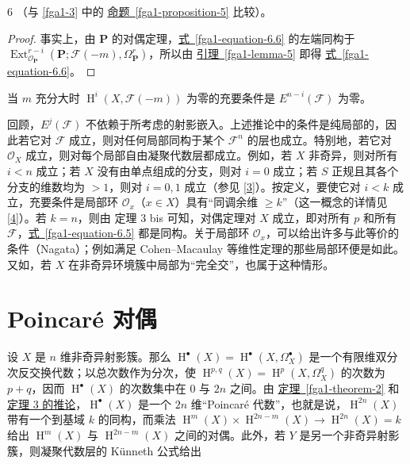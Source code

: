 \begin{proposition}{6}
（与 \cref{fga1-3} 中的 \hyperref[fga1-proposition-5]{命题~\ref*{fga1-proposition-5}} 比较）。\begin{proof}\par{}事实上，由 \(\mathbf {P}\) 的对偶定理，\hyperref[fga1-equation-6.6]{式~\ref*{fga1-equation-6.6}} 的左端同构于 \(\operatorname {Ext}_{\mathcal {O}_\mathbf {P}}^{r-i}(\mathbf {P};\mathscr {F}(-m),\Omega _\mathbf {P}^r)\)，所以由 \hyperref[fga1-lemma-5]{引理~\ref*{fga1-lemma-5}} 即得 \hyperref[fga1-equation-6.6]{式~\ref*{fga1-equation-6.6}}。\end{proof}\end{proposition}\begin{corollary}{}\label{fga1-proposition-6-corollary}\skipsinglepar\par{}当 \(m\) 充分大时 \(\operatorname {H}^i(X,\mathscr {F}(-m))\) 为零的充要条件是 \(E^{n-i}(\mathscr {F})\) 为零。\end{corollary}\par{}回顾，\(E^j(\mathscr {F})\) 不依赖于所考虑的射影嵌入。上述推论中的条件是纯局部的，因此若它对 \(\mathscr {F}\) 成立，则对任何局部同构于某个 \(\mathscr {F}^n\) 的层也成立。特别地，若它对 \(\mathcal {O}_X\) 成立，则对每个局部自由凝聚代数层都成立。例如，若 \(X\) 非奇异，则对所有 \(i<n\) 成立；若 \(X\) 没有由单点组成的分支，则对 \(i=0\) 成立；若 \(S\) 正规且其各个分支的维数均为 \(>1\)，则对 \(i=0,1\) 成立（参见 \hyperref[Ser1955]{[3]}）。按定义，要使它对 \(i<k\) 成立，充要条件是局部环 \(\mathcal {O}_x\)（\(x\in  X\)）具有“同调余维 \(\geqslant  k\)”（这一概念的详情见 \hyperref[Ser1956a]{[4]}）。若 \(k=n\)，则由 定理 3 bis 可知，对偶定理对 \(X\) 成立，即对所有 \(p\) 和所有 \(\mathscr {F}\)，\hyperref[fga1-equation-6.5]{式~\ref*{fga1-equation-6.5}} 都是同构。关于局部环 \(\mathcal {O}_x\)，可以给出许多与此等价的条件（Nagata）；例如满足 Cohen–Macaulay 等维性定理的那些局部环便是如此。又如，若 \(X\) 在非奇异环境簇中局部为“完全交”，也属于这种情形。\chapter{Poincaré 对偶}\thispagestyle{fancy}\label{fga1-7}\par{}设 \(X\) 是 \(n\) 维非奇异射影簇。那么 \(\operatorname {H}^\bullet (X)=\operatorname {H}^\bullet (X,\Omega _X^\bullet )\) 是一个有限维双分次反交换代数；以总次数作为分次，使 \(\operatorname {H}^{p,q}(X)=\operatorname {H}^p(X,\Omega _X^q)\) 的次数为 \(p+q\)，因而 \(\operatorname {H}^\bullet (X)\) 的次数集中在 \(0\) 与 \(2n\) 之间。由 \hyperref[fga1-theorem-2]{定理~\ref*{fga1-theorem-2}} 和 \hyperref[fga1-theorem-3-corollary]{定理 3 的推论}，\(\operatorname {H}^\bullet (X)\) 是一个 \(2n\) 维“Poincaré 代数”，也就是说，\(\operatorname {H}^{2n}(X)\) 带有一个到基域 \(k\) 的同构，而乘法 \(\operatorname {H}^m(X)\times \operatorname {H}^{2n-m}(X)\to \operatorname {H}^{2n}(X)=k\) 给出 \(\operatorname {H}^m(X)\) 与 \(\operatorname {H}^{2n-m}(X)\) 之间的对偶。此外，若 \(Y\) 是另一个非奇异射影簇，则凝聚代数层的 Künneth 公式给出
